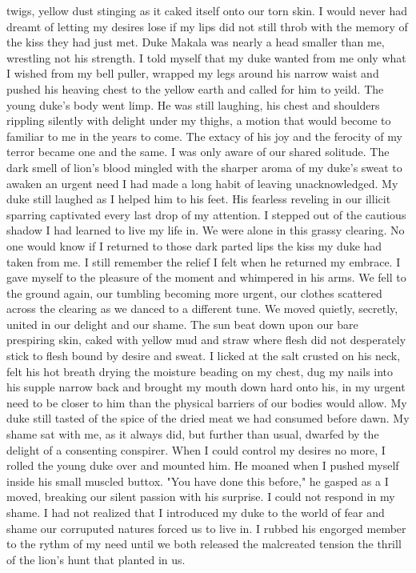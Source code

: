 \documentclass{article}
\begin{document}
twigs, yellow dust stinging as it caked itself onto our torn skin. I would never had dreamt of letting my desires lose if my lips did not still throb with the memory of the kiss they had just met. Duke Makala was nearly a head smaller than me, wrestling not his strength. I told myself that my duke wanted from me only what I wished from my bell puller, wrapped my legs around his narrow waist and pushed his heaving chest to the yellow earth and called for him to yeild. The young duke's body went limp. He was still laughing, his chest and shoulders rippling silently with delight under my thighs, a motion that would become to familiar to me in the years to come. The extacy of his joy and the ferocity of my terror became one and the same. I was only aware of our shared solitude. The dark smell of lion's blood mingled with the sharper aroma of my duke's sweat to awaken an urgent need I had made a long habit of leaving unacknowledged. My duke still laughed as I helped him to his feet. His fearless reveling in our illicit sparring captivated every last drop of my attention. I stepped out of the cautious shadow I had learned to live my life in. We were alone in this grassy clearing. No one would know if I returned to those dark parted lips the kiss my duke had taken from me. I still remember the relief I felt when he returned my embrace. I gave myself to the pleasure of the moment and whimpered in his arms. We fell to the ground again, our tumbling becoming more urgent, our clothes scattered across the clearing as we danced to a different tune. We moved quietly, secretly, united in our delight and our shame. The sun beat down upon our bare prespiring skin, caked with yellow mud and straw where flesh did not desperately stick to flesh bound by desire and  sweat. I licked at the salt crusted on his neck, felt his hot breath drying the moisture beading on my chest, dug my nails into his supple narrow back and brought my mouth down hard onto his, in my urgent need to be closer to him than the physical barriers of our bodies would allow. My duke still tasted of the spice of the dried meat we had consumed before dawn. My shame sat with me, as it always did, but further than usual, dwarfed by the delight of a consenting conspirer. When I could control my desires no more, I rolled the young duke over and mounted him. He moaned when I pushed myself inside his small muscled buttox. "You have done this before," he gasped as a I moved, breaking our silent passion with his surprise. I could not respond in my shame. I had not realized that I introduced my duke to the world of fear and shame our corruputed natures forced us to live in. I rubbed his engorged member to the rythm of my need until we both released the malcreated tension the thrill of the lion's hunt that planted in us. 
\end{document}
